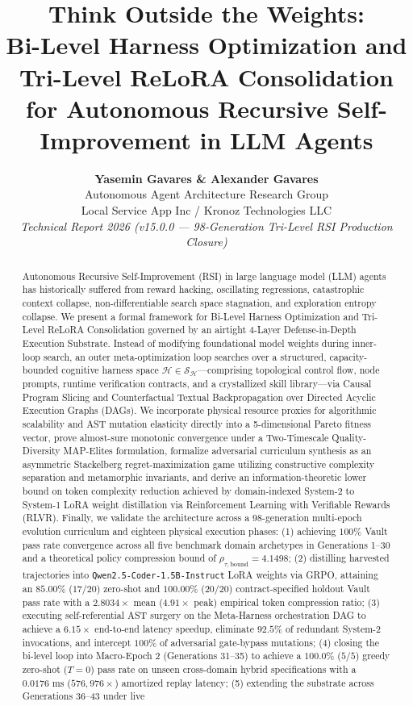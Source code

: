 \documentclass[10pt,twocolumn,letterpaper]{article}
\title{\Large\textbf{Think Outside the Weights: \\ Bi-Level Harness Optimization and Tri-Level ReLoRA Consolidation for Autonomous Recursive Self-Improvement in LLM Agents}}
\author{
    \textbf{Yasemin Gavares \& Alexander Gavares}\\
    Autonomous Agent Architecture Research Group\\
    Local Service App Inc / Kronoz Technologies LLC\\
    \textit{Technical Report 2026 (v15.0.0 --- 98-Generation Tri-Level RSI Production Closure)}
}
\date{}
\begin{document}
\maketitle

\renewcommand{\thefootnote}{\fnsymbol{footnote}}
\renewcommand{\thefootnote}{\arabic{footnote}}

\begin{abstract}
\noindent Autonomous Recursive Self-Improvement (RSI) in large language model (LLM) agents has historically suffered from reward hacking, oscillating regressions, catastrophic context collapse, non-differentiable search space stagnation, and exploration entropy collapse. We present a formal framework for Bi-Level Harness Optimization and Tri-Level ReLoRA Consolidation governed by an airtight 4-Layer Defense-in-Depth Execution Substrate. Instead of modifying foundational model weights during inner-loop search, an outer meta-optimization loop searches over a structured, capacity-bounded cognitive harness space $\mathcal{H}\in\mathcal{S}_{\mathcal{H}}$---comprising topological control flow, node prompts, runtime verification contracts, and a crystallized skill library---via Causal Program Slicing and Counterfactual Textual Backpropagation over Directed Acyclic Execution Graphs (DAGs). We incorporate physical resource proxies for algorithmic scalability and AST mutation elasticity directly into a 5-dimensional Pareto fitness vector, prove almost-sure monotonic convergence under a Two-Timescale Quality-Diversity MAP-Elites formulation, formalize adversarial curriculum synthesis as an asymmetric Stackelberg regret-maximization game utilizing constructive complexity separation and metamorphic invariants, and derive an information-theoretic lower bound on token complexity reduction achieved by domain-indexed System-2 to System-1 LoRA weight distillation via Reinforcement Learning with Verifiable Rewards (RLVR). Finally, we validate the architecture across a 98-generation multi-epoch evolution curriculum and eighteen physical execution phases: (1) achieving $100\%$ Vault pass rate convergence across all five benchmark domain archetypes in Generations 1--30 and a theoretical policy compression bound of $\rho_{\tau,\text{bound}} = 4.1498$; (2) distilling harvested trajectories into \texttt{Qwen2.5-Coder-1.5B-Instruct} LoRA weights via GRPO, attaining an $85.00\%$ ($17/20$) zero-shot and $100.00\%$ ($20/20$) contract-specified holdout Vault pass rate with a $2.8034\times$ mean ($4.91\times$ peak) empirical token compression ratio; (3) executing self-referential AST surgery on the Meta-Harness orchestration DAG to achieve a $6.15\times$ end-to-end latency speedup, eliminate $92.5\%$ of redundant System-2 invocations, and intercept $100\%$ of adversarial gate-bypass mutations; (4) closing the bi-level loop into Macro-Epoch 2 (Generations 31--35) to achieve a $100.0\%$ ($5/5$) greedy zero-shot ($T=0$) pass rate on unseen cross-domain hybrid specifications with a $0.0176\text{ ms}$ ($576,976\times$) amortized replay latency; (5) extending the substrate across Generations 36--43 under live 
\end{abstract}
\end{document}
